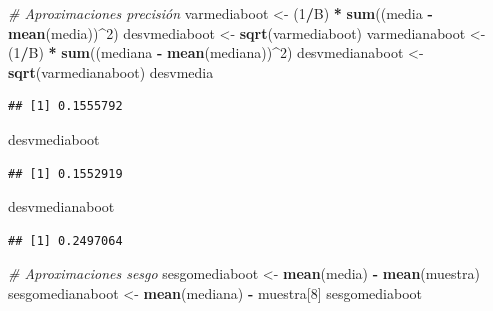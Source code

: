 \documentclass[]{book}
\newenvironment{Shaded}{\begin{snugshade}}{\end{snugshade}}
\newcommand{\KeywordTok}[1]{\textcolor[rgb]{0.13,0.29,0.53}{\textbf{#1}}}
\newcommand{\DecValTok}[1]{\textcolor[rgb]{0.00,0.00,0.81}{#1}}
\newcommand{\StringTok}[1]{\textcolor[rgb]{0.31,0.60,0.02}{#1}}
\newcommand{\CommentTok}[1]{\textcolor[rgb]{0.56,0.35,0.01}{\textit{#1}}}
\newcommand{\OperatorTok}[1]{\textcolor[rgb]{0.81,0.36,0.00}{\textbf{#1}}}
\newcommand{\NormalTok}[1]{#1}
\theoremstyle{definition}
\theoremstyle{definition}
\theoremstyle{definition}
\theoremstyle{remark}
\begin{document}
\begin{Shaded}
\begin{Highlighting}[]
\CommentTok{# Aproximaciones precisión}
\NormalTok{varmediaboot <-}\StringTok{ }\NormalTok{(}\DecValTok{1}\OperatorTok{/}\NormalTok{B) }\OperatorTok{*}\StringTok{ }\KeywordTok{sum}\NormalTok{((media }\OperatorTok{-}\StringTok{ }\KeywordTok{mean}\NormalTok{(media))}\OperatorTok{^}\DecValTok{2}\NormalTok{)}
\NormalTok{desvmediaboot <-}\StringTok{ }\KeywordTok{sqrt}\NormalTok{(varmediaboot)}
\NormalTok{varmedianaboot <-}\StringTok{ }\NormalTok{(}\DecValTok{1}\OperatorTok{/}\NormalTok{B) }\OperatorTok{*}\StringTok{ }\KeywordTok{sum}\NormalTok{((mediana }\OperatorTok{-}\StringTok{ }\KeywordTok{mean}\NormalTok{(mediana))}\OperatorTok{^}\DecValTok{2}\NormalTok{)}
\NormalTok{desvmedianaboot <-}\StringTok{ }\KeywordTok{sqrt}\NormalTok{(varmedianaboot)}
\NormalTok{desvmedia}
\end{Highlighting}
\end{Shaded}

\begin{verbatim}
## [1] 0.1555792
\end{verbatim}

\begin{Shaded}
\begin{Highlighting}[]
\NormalTok{desvmediaboot}
\end{Highlighting}
\end{Shaded}

\begin{verbatim}
## [1] 0.1552919
\end{verbatim}

\begin{Shaded}
\begin{Highlighting}[]
\NormalTok{desvmedianaboot}
\end{Highlighting}
\end{Shaded}

\begin{verbatim}
## [1] 0.2497064
\end{verbatim}

\begin{Shaded}
\begin{Highlighting}[]
\CommentTok{# Aproximaciones sesgo}
\NormalTok{sesgomediaboot <-}\StringTok{ }\KeywordTok{mean}\NormalTok{(media) }\OperatorTok{-}\StringTok{ }\KeywordTok{mean}\NormalTok{(muestra)}
\NormalTok{sesgomedianaboot <-}\StringTok{ }\KeywordTok{mean}\NormalTok{(mediana) }\OperatorTok{-}\StringTok{ }\NormalTok{muestra[}\DecValTok{8}\NormalTok{]}
\NormalTok{sesgomediaboot}
\end{Highlighting}
\end{Shaded}
\end{document}

